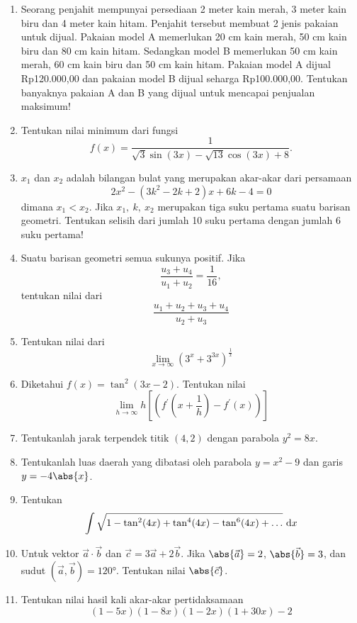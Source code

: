 \begin{enumerate}
\item Seorang penjahit mempunyai persediaan 2 meter kain merah, 3 meter kain biru dan 4 meter kain hitam. Penjahit tersebut membuat 2 jenis pakaian untuk dijual. Pakaian model A memerlukan 20 cm kain merah, 50 cm kain biru dan 80 cm kain hitam.  Sedangkan model B memerlukan 50 cm kain merah, 60 cm kain biru dan 50 cm kain hitam. Pakaian model A dijual Rp120.000,00 dan pakaian model B dijual seharga Rp100.000,00. Tentukan banyaknya pakaian A dan B yang dijual untuk mencapai penjualan maksimum!

\item Tentukan nilai minimum dari fungsi $$f(x) = \frac{1}{\sqrt{3}\sin(3x) - \sqrt{13}\cos(3x)+8}.$$

\item $x_1$ dan $x_2$ adalah bilangan bulat yang merupakan akar-akar dari persamaan $$2x^2 - (3k^2-2k+2)x + 6k-4 = 0$$ dimana $x_1<x_2$. Jika $x_1,\ k,\ x_2$ merupakan tiga suku pertama suatu barisan geometri. Tentukan selisih dari jumlah 10 suku pertama dengan jumlah 6 suku pertama!

\item Suatu barisan geometri semua sukunya positif. Jika $$\frac{u_3+u_4}{u_1+u_2} = \frac{1}{16},$$ tentukan nilai dari $$\frac{u_1+u_2+u_3+u_4}{u_2+u_3}$$

\item Tentukan nilai dari $$\lim_{x\to\infty}(3^x + 3^{3x})^{\frac{1}{x}}$$

\item Diketahui $f(x) = \tan^2(3x-2)$. Tentukan nilai $$\lim_{h\to\infty}h\left[\left(f^\prime\left(x+\frac{1}{h}\right)-f^\prime(x)\right)\right]$$

\item Tentukanlah jarak terpendek titik $(4,2)$ dengan parabola $y^2=8x$.

\item Tentukanlah luas daerah yang dibatasi oleh parabola $y=x^2-9$ dan garis $y=-4\abs{x}$.

\item Tentukan $$\int \sqrt{1-\tan^2(4x)+\tan^{4}(4x)-\tan^6(4x)+\ldots}\text{ d}x$$

\item Untuk vektor $\vec{a}\cdot\vec{b}$ dan $\vec{c} = 3\vec{a}+2\vec{b}$. Jika $\abs{\vec{a}} = 2$, $\abs{\vec{b}} = 3$, dan sudut $\left(\vec{a},\vec{b}\right) = \ang{120}.$ Tentukan nilai $\abs{\vec{c}}$.

\item Tentukan nilai hasil kali akar-akar pertidaksamaan $$(1-5x)(1-8x)(1-2x)(1+30x) - 2$$


\end{enumerate}

